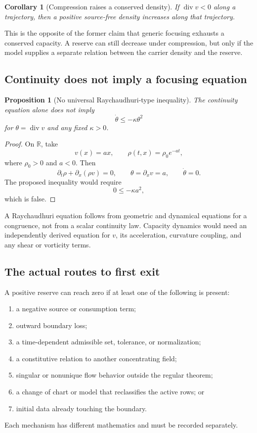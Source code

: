\documentclass[11pt]{article}
\newtheorem{proposition}[theorem]{Proposition}
\newtheorem{corollary}[theorem]{Corollary}
\theoremstyle{definition}
\theoremstyle{remark}
\newcommand{\Div}{\operatorname{div}}
\begin{document}
\begin{corollary}[Compression raises a conserved density]
If \(\Div v<0\) along a trajectory, then a positive source-free density
increases along that trajectory.
\end{corollary}

This is the opposite of the former claim that generic focusing exhausts a
conserved capacity.  A reserve can still decrease under compression, but
only if the model supplies a separate relation between the carrier density
and the reserve.

\subsection{Continuity does not imply a focusing equation}

\begin{proposition}[No universal Raychaudhuri-type inequality]
\label{prop:nofocus}
The continuity equation alone does not imply
\[
 \dot\theta\le-\kappa\theta^2
\]
for \(\theta=\Div v\) and any fixed \(\kappa>0\).
\end{proposition}

\begin{proof}
On \(\mathbb R\), take
\[
 v(x)=ax,
 \qquad
 \rho(t,x)=\rho_0e^{-at},
\]
where \(\rho_0>0\) and \(a<0\).  Then
\[
 \partial_t\rho+\partial_x(\rho v)=0,
\qquad
 \theta=\partial_xv=a,
\qquad
 \dot\theta=0.
\]
The proposed inequality would require
\[
 0\le-\kappa a^2,
\]
which is false.
\end{proof}

A Raychaudhuri equation follows from geometric and dynamical equations for
a congruence, not from a scalar continuity law.  Capacity dynamics would
need an independently derived equation for \(v\), its acceleration,
curvature coupling, and any shear or vorticity terms.

\subsection{The actual routes to first exit}

A positive reserve can reach zero if at least one of the following is
present:
\begin{enumerate}[leftmargin=2em]
\item a negative source or consumption term;
\item outward boundary loss;
\item a time-dependent admissible set, tolerance, or normalization;
\item a constitutive relation to another concentrating field;
\item singular or nonunique flow behavior outside the regular theorem;
\item a change of chart or model that reclassifies the active rows; or
\item initial data already touching the boundary.
\end{enumerate}
Each mechanism has different mathematics and must be recorded separately.
\end{document}
